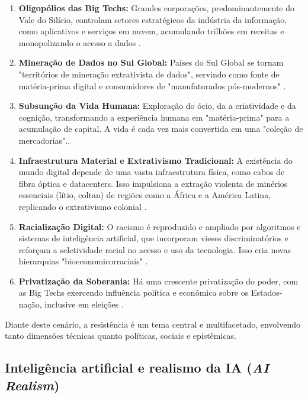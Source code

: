\begin{enumerate}
    \item \textbf{Oligopólios das Big Techs:} Grandes corporações, predominantemente do Vale do Silício, controlam setores estratégicos da indústria da informação, como aplicativos e serviços em nuvem, acumulando trilhões em receitas e monopolizando o acesso a dados \cite{Faustino2023, Silva2023, furtado2024, couldry2018, Zuboff2019}.
    \item \textbf{Mineração de Dados no Sul Global:} Países do Sul Global se tornam "territórios de mineração extrativista de dados", servindo como fonte de matéria-prima digital e consumidores de "manufaturados pós-modernos" \cite{Faustino2023, furtado2024, Silveira2021, Silva2023}.
    \item \textbf{Subsunção da Vida Humana:} Exploração do ócio, da a criatividade e da cognição, transformando a experiência humana em "matéria-prima" para a acumulação de capital. A vida é cada vez mais convertida em uma "coleção de mercadorias"\cite{Faustino2023, couldry2018, Silveira2021, Zuboff2019}..
    \item \textbf{Infraestrutura Material e Extrativismo Tradicional:} A existência do mundo digital depende de uma vasta infraestrutura física, como cabos de fibra óptica e datacenters. Isso impulsiona a extração violenta de minérios essenciais (lítio, coltan) de regiões como a África e a América Latina, replicando o extrativismo colonial \cite{Faustino2023, Figueiredo2023}.
    \item \textbf{Racialização Digital:} O racismo é reproduzido e ampliado por algoritmos e sistemas de inteligência artificial, que incorporam vieses discriminatórios e reforçam a seletividade racial no acesso e uso da tecnologia. Isso cria novas hierarquias "bioeconomicorraciais" \cite{Faustino2023}.
    \item \textbf{Privatização da Soberania:} Há uma crescente privatização do poder, com as Big Techs exercendo influência política e econômica sobre os Estados-nação, inclusive em eleições \cite{Faustino2023}.
\end{enumerate}

Diante deste cenário, a resistência é um tema central e multifacetado, envolvendo tanto dimensões técnicas quanto políticas, sociais e epistêmicas.

\subsection{Inteligência artificial e realismo da IA (\textit{AI Realism})}
\label{sec:ia-realismo-ia}

